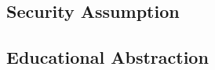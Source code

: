 \subsection{Security Assumption}
\label{sec:securityAssumption}

\subsection{Educational Abstraction}
\label{sec:educationalAbstraction}
